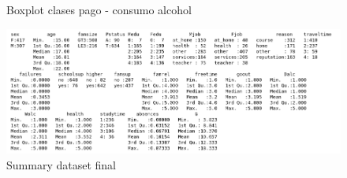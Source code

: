 \documentclass[12pt,a4paper]{article}
\begin{document}
\begin{figure}[ht!]
	\hfill
	\caption{Boxplot clases pago - consumo alcohol}
	\label{fig:bppaid}
\end{figure}


\begin{figure}[ht!]
	\centering
	\includegraphics[trim = 0mm 0mm 0mm 0mm, clip,scale=0.4]{images/summary_final}
	\caption{Summary dataset final}
	\label{fig:sum4}
\end{figure}
\end{document}

